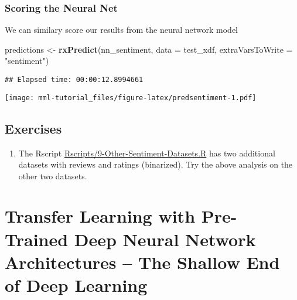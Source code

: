 \documentclass[]{book}
\newenvironment{Shaded}{\begin{snugshade}}{\end{snugshade}}
\newcommand{\KeywordTok}[1]{\textcolor[rgb]{0.13,0.29,0.53}{\textbf{#1}}}
\newcommand{\DataTypeTok}[1]{\textcolor[rgb]{0.13,0.29,0.53}{#1}}
\newcommand{\StringTok}[1]{\textcolor[rgb]{0.31,0.60,0.02}{#1}}
\newcommand{\OperatorTok}[1]{\textcolor[rgb]{0.81,0.36,0.00}{\textbf{#1}}}
\newcommand{\NormalTok}[1]{#1}
\providecommand{\tightlist}{%
  \setlength{\itemsep}{0pt}\setlength{\parskip}{0pt}}
\theoremstyle{definition}
\theoremstyle{definition}
\theoremstyle{definition}
\theoremstyle{remark}
\begin{document}
\subsection{Scoring the Neural Net}\label{scoring-the-neural-net}

We can similary score our results from the neural network model

\begin{Shaded}
\begin{Highlighting}[]
\NormalTok{predictions <-}\StringTok{ }\KeywordTok{rxPredict}\NormalTok{(nn_sentiment, }\DataTypeTok{data =}\NormalTok{ test_xdf, }\DataTypeTok{extraVarsToWrite =} \StringTok{"sentiment"}\NormalTok{)}
\end{Highlighting}
\end{Shaded}

\begin{verbatim}
## Elapsed time: 00:00:12.8994661
\end{verbatim}

\begin{Shaded}
\end{Shaded}

\texttt{[image: mml-tutorial\_files/figure-latex/predsentiment-1.pdf]}

\section{Exercises}\label{exercises-2}

\begin{enumerate}
\def\labelenumi{\arabic{enumi}.}
\tightlist
\item
  The Rscript
  \href{../Rscripts/9-Other-Sentiment-Datasets.R}{Rscripts/9-Other-Sentiment-Datasets.R}
  has two additional datasets with reviews and ratings (binarized). Try
  the above analysis on the other two datasets.
\end{enumerate}

\chapter{Transfer Learning with Pre-Trained Deep Neural Network
Architectures -- The Shallow End of Deep
Learning}\label{transfer-learning-with-pre-trained-deep-neural-network-architectures-the-shallow-end-of-deep-learning}
\end{document}
